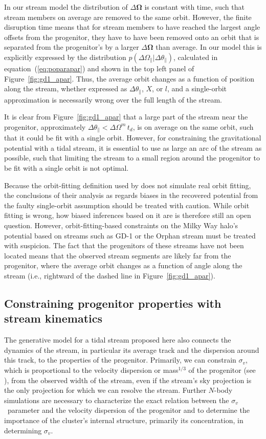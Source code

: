 \documentclass[12pt,preprint]{aastex}
\newcommand{\ie}{i.e.}
\newcommand{\eqnname}{equation}
\newcommand{\equationname}{\eqnname}
\renewcommand{\figurename}{Figure}
\renewcommand{\vec}[1]{\ensuremath{\mathbf{#1}}}
\newcommand{\veco}{\ensuremath{\vec{\Omega}}}
\newcommand{\sigv}{\ensuremath{\sigma_v}}
\newcommand{\apar}{\ensuremath{\theta_\parallel}}
\newcommand{\opar}{\ensuremath{\Omega_\parallel}}
\begin{document}
In our stream model the distribution of $\Delta \veco$ is constant
with time, such that stream members on average are removed to the same
orbit. However, the finite disruption time means that for stream
members to have reached the largest angle offsets from the progenitor,
they have to have been removed onto an orbit that is separated from
the progenitor's by a larger $\Delta \veco$ than average. In our model
this is explicitly expressed by the distribution $p(\Delta
\opar|\Delta \apar)$, calculated in \equationname~(\ref{eq:poparapar})
and shown in the top left panel of
\figurename~\ref{fig:gd1_apar}. Thus, the average orbit changes as a
function of position along the stream, whether expressed as $\Delta
\apar$, $X$, or $l$, and a single-orbit approximation is necessarily
wrong over the full length of the stream.

It is clear from \figurename~\ref{fig:gd1_apar} that a large part of
the stream near the progenitor, approximately $\Delta \apar < \Delta
\Omega^m\,t_d$, is on average on the same orbit, such that it could be
fit with a single orbit. However, for constraining the gravitational
potential with a tidal stream, it is essential to use as large an arc
of the stream as possible, such that limiting the stream to a small
region around the progenitor to be fit with a single orbit is not
optimal.

Because the orbit-fitting definition used by \citet{Sanders13a} does
not simulate real orbit fitting, the conclusions of their analysis as
regards biases in the recovered potential from the faulty single-orbit
assumption should be treated with caution. While orbit fitting is
wrong, how biased inferences based on it are is therefore still an
open question. However, orbit-fitting-based constraints on the Milky
Way halo's potential based on streams such as GD-1 or the Orphan
stream must be treated with suspicion. The fact that the progenitors
of these streams have not been located means that the observed stream
segments are likely far from the progenitor, where the average orbit
changes as a function of angle along the stream (\ie, rightward of the
dashed line in \figurename~\ref{fig:gd1_apar}).


\subsection{Constraining progenitor properties with stream kinematics}

The generative model for a tidal stream proposed here also connects
the dynamics of the stream, in particular its average track and the
dispersion around this track, to the properties of the
progenitor. Primarily, we can constrain $\sigv$, which is proportional
to the velocity dispersion or mass$^{1/3}$ of the progenitor (see
\citealt{Sanders13a}), from the observed width of the stream, even if
the stream's sky projection is the only projection for which we can
resolve the stream. Further $N$-body simulations are necessary to
characterize the exact relation between the \sigv\ parameter and the
velocity dispersion of the progenitor and to determine the importance
of the cluster's internal structure, primarily its concentration, in
determining \sigv.
\end{document}
